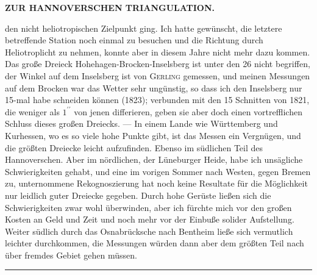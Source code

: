 \clearpage
\noindent\null\hfill{\small\textbf{ZUR HANNOVERSCHEN TRIANGULATION.}}\hfill{}\par\medskip
\noindent den nicht heliotropischen Zielpunkt ging.
Ich hatte gewünscht, die letztere betreffende Station noch einmal zu besuchen und die Richtung durch Heliotroplicht zu nehmen, konnte aber in diesem Jahre nicht mehr dazu kommen.
Das große Dreieck Hohehagen-Brocken-Inselsberg ist unter den 26 nicht begriffen, der Winkel auf dem Inselsberg ist von \textsc{Gerling} gemessen, und meinen Messungen auf dem Brocken war das Wetter sehr ungünstig, so dass ich den Inselsberg nur 15-mal habe schneiden können (1823); verbunden mit den 15 Schnitten von 1821, die weniger als \(1^{\prime\prime}\) von jenen differieren, geben sie aber doch einen vortrefflichen Schluss dieses großen Dreiecks. --- In einem Lande wie Württemberg und Kurhessen, wo es so viele hohe Punkte gibt, ist das Messen ein Vergnügen, und die größten Dreiecke leicht aufzufinden.
Ebenso im südlichen Teil des Hannoverschen.
Aber im nördlichen, der Lüneburger Heide, habe ich unsägliche Schwierigkeiten gehabt, und eine im vorigen Sommer nach Westen, gegen Bremen zu, unternommene Rekognoszierung hat noch keine Resultate für die Möglichkeit nur leidlich guter Dreiecke gegeben.
Durch hohe Gerüste ließen sich die Schwierigkeiten zwar wohl überwinden, aber ich fürchte mich vor den großen Kosten an Geld und Zeit und noch mehr vor der Einbuße solider Aufstellung.
Weiter südlich durch das Osnabrücksche nach Bentheim ließe sich vermutlich leichter durchkommen, die Messungen würden dann aber dem größten Teil nach über fremdes Gebiet gehen müssen.

\begin{center}\rule{.24\textwidth}{.4pt}\end{center}
